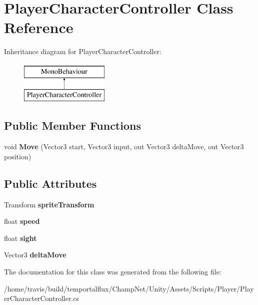 \hypertarget{class_player_character_controller}{\section{Player\-Character\-Controller Class Reference}
\label{class_player_character_controller}
}
Inheritance diagram for Player\-Character\-Controller\-:\begin{figure}[H]
\begin{center}
\leavevmode
\includegraphics[height=2.000000cm]{class_player_character_controller}
\end{center}
\end{figure}
\subsection*{Public Member Functions}
\begin{DoxyCompactItemize}
\item 
\hypertarget{class_player_character_controller_afa2260da91d3f72d414e192353d89646}{void {\bfseries Move} (Vector3 start, Vector3 input, out Vector3 delta\-Move, out Vector3 position)}\label{class_player_character_controller_afa2260da91d3f72d414e192353d89646}

\end{DoxyCompactItemize}
\subsection*{Public Attributes}
\begin{DoxyCompactItemize}
\item 
\hypertarget{class_player_character_controller_aa7fa26a9c3b5494959cfd26ac3e55371}{Transform {\bfseries sprite\-Transform}}\label{class_player_character_controller_aa7fa26a9c3b5494959cfd26ac3e55371}

\item 
\hypertarget{class_player_character_controller_a55d2ff4f62604d521c28242e5ff9e8b2}{float {\bfseries speed}}\label{class_player_character_controller_a55d2ff4f62604d521c28242e5ff9e8b2}

\item 
\hypertarget{class_player_character_controller_aad00d245dd8416129b2c574792a8cc2c}{float {\bfseries sight}}\label{class_player_character_controller_aad00d245dd8416129b2c574792a8cc2c}

\item 
\hypertarget{class_player_character_controller_a11c68e7205de61cccbfdb516a5fa38e3}{Vector3 {\bfseries delta\-Move}}\label{class_player_character_controller_a11c68e7205de61cccbfdb516a5fa38e3}

\end{DoxyCompactItemize}


The documentation for this class was generated from the following file\-:\begin{DoxyCompactItemize}
\item 
/home/travis/build/temportalflux/\-Champ\-Net/\-Unity/\-Assets/\-Scripts/\-Player/Player\-Character\-Controller.\-cs\end{DoxyCompactItemize}
